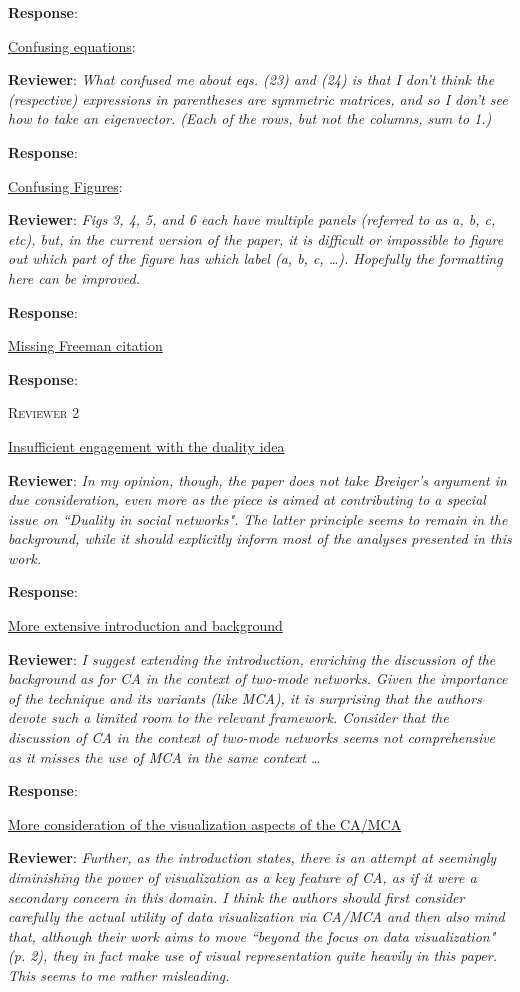\documentclass{article}
\begin{document}
\textbf{Response}:

\underline{Confusing equations}:

\textbf{Reviewer}: \textit{What confused me about eqs. (23) and (24) is that I don't think the (respective) expressions in parentheses are symmetric matrices, and so I don't see how to take an eigenvector. (Each of the rows, but not the columns, sum to 1.)}

\textbf{Response}:

\underline{Confusing Figures}:

\textbf{Reviewer}: \textit{Figs 3, 4, 5, and 6 each have multiple panels (referred to as a, b, c, etc), but, in the current version of the paper, it is difficult or impossible to figure out which part of the figure has which label (a, b, c, …). Hopefully the formatting here can be improved.}

\textbf{Response}:


\underline{Missing Freeman citation}

\textbf{Response}:

\newpage
\textsc{Reviewer 2}

\underline{Insufficient engagement with the duality idea}

\textbf{Reviewer}: \textit{In my opinion, though, the paper does not take Breiger's argument in due consideration, even more as the piece is aimed at contributing to a special issue on ``Duality in social networks". The latter principle seems to remain in the background, while it should explicitly inform most of the analyses presented in this work.}

\textbf{Response}:

\underline{More extensive introduction and background}

\textbf{Reviewer}: \textit{I suggest extending the introduction, enriching the discussion of the background as for CA in the context of two-mode networks. Given the importance of the technique and its variants (like MCA), it is surprising that the authors devote such a limited room to the relevant framework. Consider that the discussion of CA in the context of two-mode networks seems not comprehensive as it misses the use of MCA in the same context \ldots}

\textbf{Response}:

\underline{More consideration of the visualization aspects of the CA/MCA}

\textbf{Reviewer}: \textit{Further, as the introduction states, there is an attempt at seemingly diminishing the power of visualization as a key feature of CA, as if it were a secondary concern in this domain. I think the authors should first consider carefully the actual utility of data visualization via CA/MCA and then also mind that, although their work aims to move ``beyond the focus on data visualization" (p. 2), they in fact make use of visual representation quite heavily in this paper. This seems to me rather misleading.} 
\end{document}
